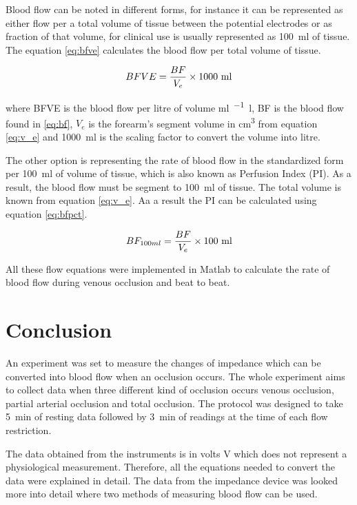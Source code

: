 Blood flow can be noted in different forms, for instance it can be represented as either flow per a total volume of tissue between the potential electrodes or as fraction of that volume, for clinical use is usually represented as \SI{100}{\milli\litre} of tissue. The equation \ref{eq:bfve} calculates the blood flow per total volume of tissue.

\begin{align}
	\label{eq:bfve}
	BFVE = \frac{BF}{V_e} \times \text{1000 ml} \tagaddtext{[\si{\ml\per\min.\litre}]}
\end{align}

where BFVE is the blood flow per litre of volume \si{\ml\per\min.\litre}, BF is the blood flow found in \ref{eq:bf}, $V_e$ is the forearm's segment volume in \si{\cubic\cm} from equation \ref{eq:v_e} and \SI{1000}{\milli\litre} is the scaling factor to convert the volume into litre.

The other option is representing the rate of blood flow in the standardized form per \SI{100}{\milli\litre} of volume of tissue, which is also known as Perfusion Index (PI). As a result, the blood flow must be segment to \SI{100}{\milli\litre} of tissue. The total volume is known from equation \ref{eq:v_e}. Aa a result the PI can be calculated using equation  \ref{eq:bfpct}. 

\begin{align}
	\label{eq:bfpct}
	BF_{100ml} = \frac{BF}{V_e} \times \text{100 ml} \tagaddtext{[\si{\bfv}]}
\end{align}

All these flow equations were implemented in Matlab to calculate the rate of blood flow during venous occlusion and beat to beat.

\section{Conclusion}
An experiment was set to measure the changes of impedance which can be converted into blood flow when an occlusion occurs. The whole experiment aims to collect data when three different kind of occlusion occurs venous occlusion, partial arterial occlusion and total occlusion. The protocol was designed to take \SI{5}{\minute} of resting data followed by \SI{3}{\minute} of readings at the time of each flow restriction.

The data obtained from the instruments is in volts \si{\volt} which does not represent a physiological measurement. Therefore, all the equations needed to convert the data were explained in detail. The data from the impedance device was looked more into detail where two methods of measuring blood flow can be used. 

